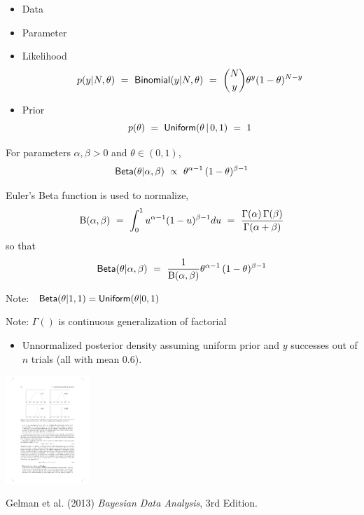 \documentclass[10pt]{report}
\begin{document}
\begin{itemize}
\item{Data}
\item Parameter
\item Likelihood
\[
p(y|N,\theta) 
\ = \ \text{\sf Binomial}(y|N,\theta) 
\ = \ \binom{N}{y} \theta^{y} (1 - \theta)^{N-y}
\]
\item Prior
\[
p(\theta) 
\ = \ \text{\sf Uniform}(\theta \, | \, 0,1) 
\ = \ 1
\]
\end{itemize}

\begin{itemize}
\item For parameters $\alpha,\beta > 0$ and $\theta \in (0,1)$,
\[
\text{\sf Beta}(\theta|\alpha,\beta) 
\ \propto \
      \theta^{\alpha - 1} \, 
      (1 - \theta)^{\beta-1}
\]
{\footnotesize
\item Euler's Beta function is used to normalize,
\[
{\text B}(\alpha,\beta) 
\ = \ \int_0^1 u^{\alpha-1}(1-u)^{\beta-1} du
\ = \ \frac{\Gamma(\alpha)\,\Gamma(\beta)}{\Gamma(\alpha + \beta)}
\]
so that
\[
\text{\sf Beta}(\theta|\alpha,\beta) 
\ = \ \frac{1}{{\text B}(\alpha,\beta)} 
      \theta^{\alpha - 1} \, 
      (1 - \theta)^{\beta-1}
\] 
}
\vfill
\item Note: \ $\text{\sf Beta}(\theta|1,1) = \text{\sf Uniform}(\theta|0,1)$
\item Note: $\Gamma()$ is continuous generalization of factorial
\end{itemize}

\vspace*{-4pt}
\begin{itemize}
\item Unnormalized posterior density assuming uniform prior and $y$
  successes out of $n$ trials (all with mean 0.6).
\end{itemize}
\begin{center}
\includegraphics[height=1.6in]{img/bda-beta-plots.pdf}
\end{center}
\vspace*{-12pt}
\hfill {\tiny Gelman et al. (2013) {\slshape Bayesian Data Analysis},
  3rd Edition.}
\end{document}
